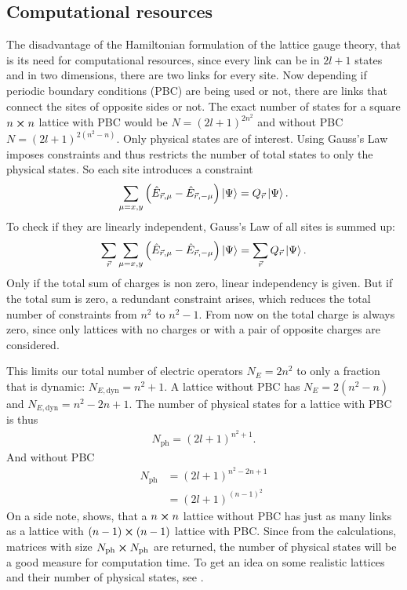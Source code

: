 \subsection{Computational resources}
The disadvantage of the Hamiltonian formulation of the lattice gauge theory, that is its need for computational resources,\cite{Feynman1982} since every link can be in $2l+1$ states and in two dimensions, there are two links for every site. Now depending if periodic boundary conditions (PBC) are being used or not, there are links that connect the sites of opposite sides or not.
The exact number of states for a square $n \cross n$ lattice with PBC would be $N=(2l+1)^{2n^2}$ and without PBC $N=(2l+1)^{2(n^2-n)}$. Only physical states are of interest. Using Gauss's Law imposes constraints and thus restricts the number of total states to only the physical states. So each site introduces a constraint
\begin{align}
  \sum_{\mu=x,y}\left(\hat{E}_{\vec{r}, \mu} - \hat{E}_{\vec{r}, -\mu}\right)\ket{\Psi} = Q_{\vec{r}}\ket{\Psi}.
\end{align}
To check if they are linearly independent, Gauss's Law of all sites is summed up:
\begin{align}
	\sum_{\vec{r}}\sum_{\mu=x,y}\left(\hat{E}_{\vec{r}, \mu} - \hat{E}_{\vec{r}, -\mu}\right)\ket{\Psi} = \sum_{\vec{r}}Q_{\vec{r}}\ket{\Psi}.
\end{align}
Only if the total sum of charges is non zero, linear independency is given. But if the total sum is zero, a redundant constraint arises, which reduces the total number of constraints from $n^2$ to $n^2 -1$. From now on the total charge is always zero, since only lattices with no charges or with a pair of opposite charges are considered.

This limits our total number of electric operators $N_{E}=2n^2$ to only a fraction that is dynamic: $N_{E,\text{dyn}} = n^2+1$. A lattice without PBC has $N_{E}=2(n^2-n)$ and $N_{E,\text{dyn}} = n^2-2n+1$.
The number of physical states for a lattice with PBC is thus
\begin{align}
	N_{\text{ph}}=(2l+1)^{n^2+1}.
\end{align}
And without PBC
\begin{align}
	N_{\text{ph}} & =(2l+1)^{n^2-2n+1}                \\
	              & =(2l+1)^{(n-1)^{2}}\label{eq:pbc}
\end{align}
On a side note,  shows, that a $n\cross n$ lattice without PBC has just as many links as a lattice with $(n-1)\cross(n-1)$ lattice with PBC.
Since from the calculations, matrices with size $N_{\text{ph}} \cross N_{\text{ph}}$ are returned, the number of physical states will be a good measure for computation time.
To get an idea on some realistic lattices and their number of physical states, see .

